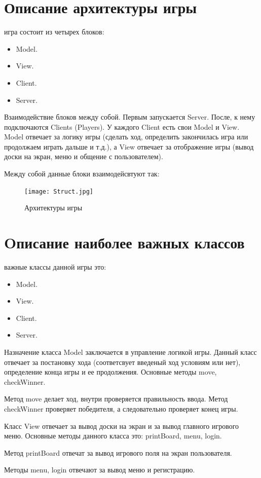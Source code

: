 \documentclass[a4paper,14pt]{extarticle} %
\begin{document}
\newpage
\section*{Описание архитектуры игры}
 игра состоит из четырех блоков:
\begin{itemize}
\item{Model.}
\item{View.}
\item{Client.}
\item{Server.}
\end{itemize}
\qquad
Взаимодействие блоков между собой.
Первым запускается Server. После, к нему подключаются Clients (Players). У каждого Client есть свои Model и View. Model отвечает за логику игры (сделать ход, определить закончилась игра или продолжаем играть дальше и т.д.), а View отвечает за отображение игры (вывод доски на экран, меню и общение с пользователем).

Между собой данные блоки взаимодейсвтуют так:
\newpage
\begin{figure}[h]
\centering
\texttt{[image: Struct.jpg]}
\caption{Архитектуры игры}
\label{fig:mpr}
\end{figure}

\newpage
\section*{Oписание наиболее важных классов}
 важные классы данной игры это:
\begin{itemize}
\item{Model.}
\item{View.}
\item{Client.}
\item{Server.}
\end{itemize}
Назначение класса Model заключается в управление логикой игры. Данный класс отвечает за постановку хода (соответсвует введеный ход условиям или нет), определение конца игры и ее продолжения. Основные методы move, checkWinner.

Метод move делает ход, внутри проверяется правильность ввода. Метод checkWinner проверяет победителя, а следовательно проверяет конец игры.  

Класс View отвечает за вывод доски на экран и за вывод главного игрового меню. Основные методы данного класса это: printBoard, menu, login. 

Метод printBoard отвечат за вывод игрового поля на экран пользователя.

Методы menu, login отвечают за вывод меню и регистрацию.
\end{document}
